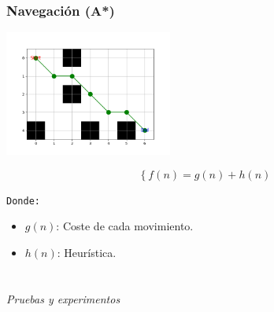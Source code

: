 \documentclass{beamer}
\begin{document}
\begin{frame}
\frametitle{Navegación (A*)}
\centering


\begin{minipage}{0.45\textwidth}
    \centering
    \includegraphics[width=5.5cm]{figs/astar4.png}
\end{minipage}

\vspace{-0.6cm} %
\begin{equation}
\left\{
	f(n) = g(n) + h(n)
\right.
\label{ec:ec678}
\end{equation}

\texttt{Donde:}
\begin{itemize}
    \item $g(n)$: Coste de cada movimiento.
    \item $h(n)$: Heurística.
\end{itemize}

\end{frame}

\section*{}
\begin{frame}{}
  \centering \Huge
  \emph{Pruebas y experimentos}
\end{frame}
\end{document}
